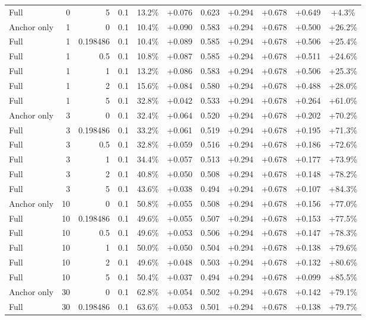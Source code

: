 \begin{table}[htbp]
\begin{tabular}{lrrrccccccc}
Full & 0 & 5 & 0.1 & 13.2\% & +0.076 & 0.623 & +0.294 & +0.678 & +0.649 & +4.3\% \\
Anchor only & 1 & 0 & 0.1 & 10.4\% & +0.090 & 0.583 & +0.294 & +0.678 & +0.500 & +26.2\% \\
Full & 1 & 0.198486 & 0.1 & 10.4\% & +0.089 & 0.585 & +0.294 & +0.678 & +0.506 & +25.4\% \\
Full & 1 & 0.5 & 0.1 & 10.8\% & +0.087 & 0.585 & +0.294 & +0.678 & +0.511 & +24.6\% \\
Full & 1 & 1 & 0.1 & 13.2\% & +0.086 & 0.583 & +0.294 & +0.678 & +0.506 & +25.3\% \\
Full & 1 & 2 & 0.1 & 15.6\% & +0.084 & 0.580 & +0.294 & +0.678 & +0.488 & +28.0\% \\
Full & 1 & 5 & 0.1 & 32.8\% & +0.042 & 0.533 & +0.294 & +0.678 & +0.264 & +61.0\% \\
Anchor only & 3 & 0 & 0.1 & 32.4\% & +0.064 & 0.520 & +0.294 & +0.678 & +0.202 & +70.2\% \\
Full & 3 & 0.198486 & 0.1 & 33.2\% & +0.061 & 0.519 & +0.294 & +0.678 & +0.195 & +71.3\% \\
Full & 3 & 0.5 & 0.1 & 32.8\% & +0.059 & 0.516 & +0.294 & +0.678 & +0.186 & +72.6\% \\
Full & 3 & 1 & 0.1 & 34.4\% & +0.057 & 0.513 & +0.294 & +0.678 & +0.177 & +73.9\% \\
Full & 3 & 2 & 0.1 & 40.8\% & +0.050 & 0.508 & +0.294 & +0.678 & +0.148 & +78.2\% \\
Full & 3 & 5 & 0.1 & 43.6\% & +0.038 & 0.494 & +0.294 & +0.678 & +0.107 & +84.3\% \\
Anchor only & 10 & 0 & 0.1 & 50.8\% & +0.055 & 0.508 & +0.294 & +0.678 & +0.156 & +77.0\% \\
Full & 10 & 0.198486 & 0.1 & 49.6\% & +0.055 & 0.507 & +0.294 & +0.678 & +0.153 & +77.5\% \\
Full & 10 & 0.5 & 0.1 & 49.6\% & +0.053 & 0.506 & +0.294 & +0.678 & +0.147 & +78.3\% \\
Full & 10 & 1 & 0.1 & 50.0\% & +0.050 & 0.504 & +0.294 & +0.678 & +0.138 & +79.6\% \\
Full & 10 & 2 & 0.1 & 49.6\% & +0.048 & 0.503 & +0.294 & +0.678 & +0.132 & +80.6\% \\
Full & 10 & 5 & 0.1 & 50.4\% & +0.037 & 0.494 & +0.294 & +0.678 & +0.099 & +85.5\% \\
Anchor only & 30 & 0 & 0.1 & 62.8\% & +0.054 & 0.502 & +0.294 & +0.678 & +0.142 & +79.1\% \\
Full & 30 & 0.198486 & 0.1 & 63.6\% & +0.053 & 0.501 & +0.294 & +0.678 & +0.138 & +79.7\% \\

\end{tabular}
\end{table}
